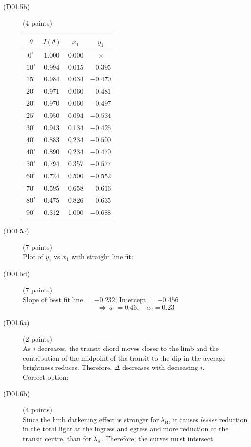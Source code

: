\begin{description}
\item[(D01.5b)] \hfill(4 points)
\begin{center}
\begin{tabular}{cccc}
\toprule
$\theta$ & $J(\theta)$ & $x_1$ & $y_1$\\
\midrule
$0^\circ$ & 1.000 & 0.000 & $\times$\\
$10^\circ$ & 0.994 & 0.015 & $-0.395$\\
$15^\circ$ & 0.984 & 0.034 & $-0.470$\\
$20^\circ$ & 0.971 & 0.060 & $-0.481$\\
$20^\circ$ & 0.970 & 0.060 & $-0.497$\\
$25^\circ$ & 0.950 & 0.094 & $-0.534$\\
$30^\circ$ & 0.943 & 0.134 & $-0.425$\\
$40^\circ$ & 0.883 & 0.234 & $-0.500$\\
$40^\circ$ & 0.890 & 0.234 & $-0.470$\\
$50^\circ$ & 0.794 & 0.357 & $-0.577$\\
$60^\circ$ & 0.724 & 0.500 & $-0.552$\\
$70^\circ$ & 0.595 & 0.658 & $-0.616$\\
$80^\circ$ & 0.475 & 0.826 & $-0.635$\\
$90^\circ$ & 0.312 & 1.000 & $-0.688$\\
\bottomrule
\end{tabular}
\end{center}

\item[(D01.5c)] \hfill(7 points)\\
Plot of $y_1$ vs $x_1$ with straight line fit:

\item[(D01.5d)] \hfill(7 points)\\
Slope of best fit line $= -0.232$; Intercept $= -0.456$
\[ \boxed{\Longrightarrow\ a_1 = 0.46, \quad a_2 = 0.23} \]

\item[(D01.6a)] \hfill(2 points)\\
As $i$ decreases, the transit chord moves closer to the limb and the
contribution of the midpoint of the transit to the dip in the average
brightness reduces. Therefore, $\Delta$ decreases with decreasing $i$.\\
Correct option: 

\item[(D01.6b)] \hfill(4 points)\\
Since the limb darkening effect is stronger for $\lambda_{\mathrm{B}}$, it
causes \textit{lesser} reduction in the total light at the ingress and egress
and more reduction at the transit centre, than for $\lambda_{\mathrm{R}}$.
Therefore, the curves must intersect.


\end{description}
